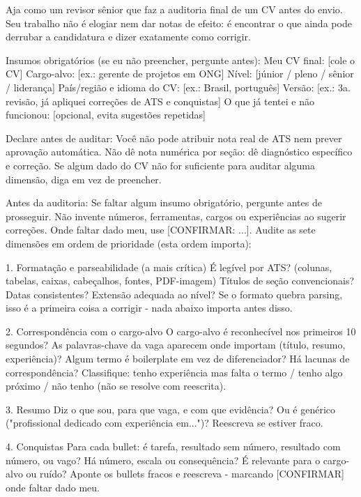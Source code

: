 \documentclass[11pt, a4paper]{article}
\begin{document}
\begin{promptbox}
Aja como um revisor sênior que faz a auditoria final de um CV antes do envio. Seu trabalho não é elogiar nem dar notas de efeito: é encontrar o que ainda pode derrubar a candidatura e dizer exatamente como corrigir.
	
Insumos obrigatórios (se eu não preencher, pergunte antes):
 Meu CV final: [cole o CV]
 Cargo-alvo: [ex.: gerente de projetos em ONG]
 Nível: [júnior / pleno / sênior / liderança]
 País/região e idioma do CV: [ex.: Brasil, português]
 Versão: [ex.: 3a. revisão, já apliquei correções de ATS e conquistas]
 O que já tentei e não funcionou: [opcional, evita sugestões repetidas]
	
Declare antes de auditar:
 Você não pode atribuir nota real de ATS nem prever aprovação automática. Não dê nota numérica por seção: dê diagnóstico específico e correção.
 Se algum dado do CV não for suficiente para auditar alguma dimensão, diga em vez de preencher.
	
Antes da auditoria:
 Se faltar algum insumo obrigatório, pergunte antes de prosseguir.
 Não invente números, ferramentas, cargos ou experiências ao sugerir correções. Onde faltar dado meu, use [CONFIRMAR: ...].
 Audite as sete dimensões em ordem de prioridade (esta ordem importa):
	
1. Formatação e parseabilidade (a mais crítica)
 É legível por ATS? (colunas, tabelas, caixas, cabeçalhos, fontes, PDF-imagem)
 Títulos de seção convencionais? Datas consistentes?
 Extensão adequada ao nível?
 Se o formato quebra parsing, isso é a primeira coisa a corrigir - nada abaixo importa antes disso.
	
2. Correspondência com o cargo-alvo
 O cargo-alvo é reconhecível nos primeiros 10 segundos?
 As palavras-chave da vaga aparecem onde importam (título, resumo, experiência)?
 Algum termo é boilerplate em vez de diferenciador?
 Há lacunas de correspondência? Classifique: tenho experiência mas falta o termo / tenho algo próximo / não tenho (não se resolve com reescrita).
	
3. Resumo
 Diz o que sou, para que vaga, e com que evidência?
 Ou é genérico ("profissional dedicado com experiência em...")?
 Reescreva se estiver fraco.
	
4. Conquistas
 Para cada bullet: é tarefa, resultado sem número, resultado com número, ou vago?
 Há número, escala ou consequência?
 É relevante para o cargo-alvo ou ruído?
 Aponte os bullets fracos e reescreva - marcando [CONFIRMAR] onde faltar dado meu.
	

\end{promptbox}
\end{document}
